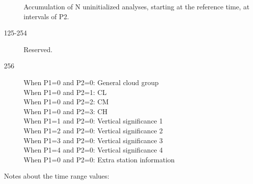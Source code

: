 \documentclass[final,12pt,a4paper,twoside]{book}
\begin{document}
\begin{description}
  Accumulation of N uninitialized analyses, starting at the reference time, at
  intervals of P2.
\item [125-254] Reserved.
\item [256]
  When P1=0 and P2=0: General cloud group \\
  When P1=0 and P2=1: CL \\
  When P1=0 and P2=2: CM \\
  When P1=0 and P2=3: CH \\
  When P1=1 and P2=0: Vertical significance 1 \\
  When P1=2 and P2=0: Vertical significance 2 \\
  When P1=3 and P2=0: Vertical significance 3 \\
  When P1=4 and P2=0: Vertical significance 4 \\
  When P1=0 and P2=0: Extra station information
\end{description}

Notes about the time range values:
\end{document}

